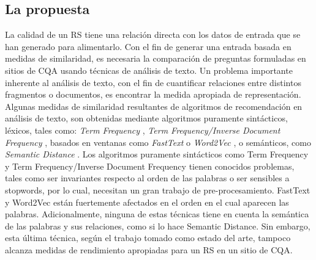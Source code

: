 \subsection{La propuesta}
\noindent La calidad de un RS tiene una relación directa con los datos de entrada que se han generado para alimentarlo. Con el fin de generar una entrada basada en medidas de similaridad, es necesaria la comparación de preguntas formuladas en sitios de CQA usando técnicas de análisis de texto.
Un problema importante inherente al análisis de texto, con el fin de cuantificar relaciones entre distintos fragmentos o documentos, es encontrar la medida apropiada de representación. Algunas medidas de similaridad resultantes de algoritmos de recomendación en análisis de texto, son obtenidas mediante algoritmos puramente sintácticos, léxicos, tales como: \textit{Term Frequency} \citep{salton5mcgill}, \textit{Term Frequency/Inverse Document Frequency} \citep{baeza1999modern}, basados en ventanas como \textit{FastText} \citep{joulin2016fasttext} o \textit{Word2Vec} \citep{mikolov2013efficient}, o semánticos, como \textit{Semantic Distance} \citep{li2006sentence}. Los algoritmos puramente sintácticos como Term Frequency y Term Frequency/Inverse Document Frequency tienen conocidos problemas, tales como ser invariantes respecto al orden de las palabras o ser sensibles a stopwords, por lo cual, necesitan un gran trabajo de pre-procesamiento. FastText y Word2Vec están fuertemente afectados en el orden en el cual aparecen las palabras. Adicionalmente, ninguna de estas técnicas tiene en cuenta la semántica de las palabras y sus relaciones, como si lo hace Semantic Distance. Sin embargo, esta última técnica, según el trabajo tomado como estado del arte, tampoco alcanza medidas de rendimiento apropiadas para un RS en un sitio de CQA.

